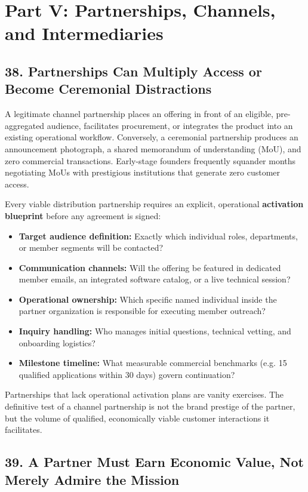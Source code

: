 \section*{Part V: Partnerships, Channels, and Intermediaries}

\subsection*{38. Partnerships Can Multiply Access or Become Ceremonial Distractions}

A legitimate channel partnership places an offering in front of an eligible, pre-aggregated audience, facilitates procurement, or integrates the product into an existing operational workflow. Conversely, a ceremonial partnership produces an announcement photograph, a shared memorandum of understanding (MoU), and zero commercial transactions. Early-stage founders frequently squander months negotiating MoUs with prestigious institutions that generate zero customer access.

Every viable distribution partnership requires an explicit, operational \textbf{activation blueprint} before any agreement is signed:
\begin{itemize}[leftmargin=*,itemsep=1pt]
  \item \textbf{Target audience definition:} Exactly which individual roles, departments, or member segments will be contacted?
  \item \textbf{Communication channels:} Will the offering be featured in dedicated member emails, an integrated software catalog, or a live technical session?
  \item \textbf{Operational ownership:} Which specific named individual inside the partner organization is responsible for executing member outreach?
  \item \textbf{Inquiry handling:} Who manages initial questions, technical vetting, and onboarding logistics?
  \item \textbf{Milestone timeline:} What measurable commercial benchmarks (e.g. 15 qualified applications within 30 days) govern continuation?
\end{itemize}

Partnerships that lack operational activation plans are vanity exercises. The definitive test of a channel partnership is not the brand prestige of the partner, but the volume of qualified, economically viable customer interactions it facilitates.

\subsection*{39. A Partner Must Earn Economic Value, Not Merely Admire the Mission}

